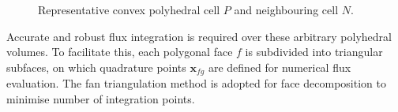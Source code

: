 \documentclass[sn-mathphys,Numbered]{sn-jnl}%
\newcommand{\bb}{\boldsymbol}
\begin{document}
\begin{figure}[h]
 	\centering
    \quad
 	\caption{Representative convex polyhedral cell $P$ and neighbouring cell $N$.}
 	\label{fig:cell}
\end{figure}
%
Accurate and robust flux integration is required over these arbitrary polyhedral volumes. 
To facilitate this, each polygonal face $f$ is subdivided into triangular subfaces, 
on which quadrature points $\bb{x}_{fg}$ are defined for numerical flux evaluation.
The fan triangulation method is adopted for face decomposition to minimise number of integration points.
\end{document}
